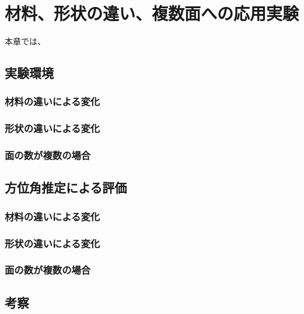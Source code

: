 \section{材料、形状の違い、複数面への応用実験}
\label{chap:experiment_pouring}
本章では、

\subsection{実験環境}
\label{sec:system_experiment}

\subsubsection{材料の違いによる変化}
\subsubsection{形状の違いによる変化}
\subsubsection{面の数が複数の場合}

\subsection{方位角推定による評価}
\label{chap:pouring_experiment}

\subsubsection{材料の違いによる変化}
\subsubsection{形状の違いによる変化}
\subsubsection{面の数が複数の場合}


\subsection{考察}
\label{sec:change_packages}

\clearpage
